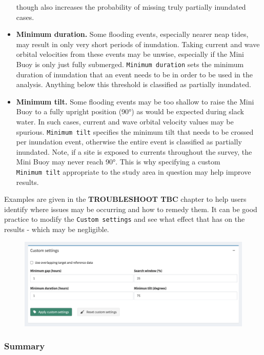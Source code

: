\documentclass[
  letterpaper,
  DIV=11,
  numbers=noendperiod]{scrreprt}
\begin{document}
\begin{itemize}
  though also increases the probability of missing truly partially
  inundated cases.
\item
  \textbf{Minimum duration.} Some flooding events, especially nearer
  neap tides, may result in only very short periods of inundation.
  Taking current and wave orbital velocities from these events may be
  unwise, especially if the Mini Buoy is only just fully submerged.
  \texttt{Minimum\ duration} sets the minimum duration of inundation
  that an event needs to be in order to be used in the analysis.
  Anything below this threshold is classified as partially inundated.
\item
  \textbf{Minimum tilt.} Some flooding events may be too shallow to
  raise the Mini Buoy to a fully upright position (90°) as would be
  expected during slack water. In such cases, current and wave orbital
  velocity values may be spurious. \texttt{Minimum\ tilt} specifies the
  minimum tilt that needs to be crossed per inundation event, otherwise
  the entire event is classified as partially inundated. Note, if a site
  is exposed to currents throughout the survey, the Mini Buoy may never
  reach 90°. This is why specifying a custom \texttt{Minimum\ tilt}
  appropriate to the study area in question may help improve results.
\end{itemize}

Examples are given in the \textbf{TROUBLESHOOT TBC} chapter to help
users identify where issues may be occurring and how to remedy them. It
can be good practice to modify the \texttt{Custom\ settings} and see
what effect that has on the results - which may be negligible.

\begin{figure}

{\centering \includegraphics[width=1\textwidth,height=\textheight]{chapters/figs/CustomSettings.png}

}

\end{figure}

\hypertarget{summary}{%
\subsubsection{Summary}\label{summary}}
\end{document}
